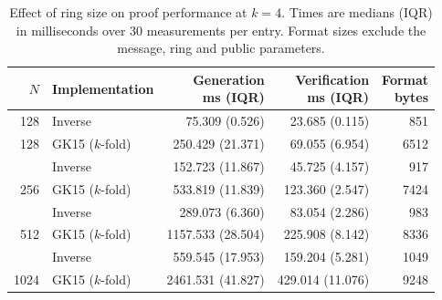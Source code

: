\begin{table}[htbp]
\centering
\caption{Effect of ring size on proof performance at $k=4$. Times are medians (IQR) in milliseconds over 30 measurements per entry. Format sizes exclude the message, ring and public parameters.}
\label{tab:evaluation-large-ring}
\small
\setlength{\tabcolsep}{4pt}
\begin{tabular}{r l r r r}
\toprule
$N$ & Implementation & \shortstack{Generation\\ms (IQR)} & \shortstack{Verification\\ms (IQR)} & \shortstack{Format\\bytes} \\
\midrule
128 & Inverse & 75.309 (0.526) & 23.685 (0.115) & 851 \\
128 & GK15 ($k$-fold) & 250.429 (21.371) & 69.055 (6.954) & 6512 \\
\addlinespace
256 & Inverse & 152.723 (11.867) & 45.725 (4.157) & 917 \\
256 & GK15 ($k$-fold) & 533.819 (11.839) & 123.360 (2.547) & 7424 \\
\addlinespace
512 & Inverse & 289.073 (6.360) & 83.054 (2.286) & 983 \\
512 & GK15 ($k$-fold) & 1157.533 (28.504) & 225.908 (8.142) & 8336 \\
\addlinespace
1024 & Inverse & 559.545 (17.953) & 159.204 (5.281) & 1049 \\
1024 & GK15 ($k$-fold) & 2461.531 (41.827) & 429.014 (11.076) & 9248 \\
\bottomrule
\end{tabular}
\end{table}
